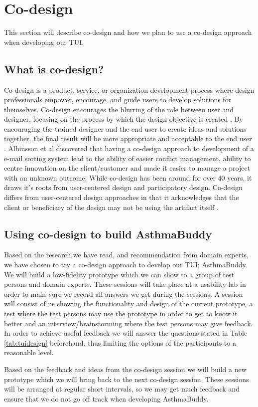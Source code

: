 \section{Co-design}
This section will describe co-design and how we plan to use a co-design approach when developing our TUI.

\subsection{What is co-design?}
Co-design is a product, service, or organization development process where design professionals empower, encourage, and guide users to develop solutions for themselves. Co-design encourages the blurring of the role between user and designer, focusing on the process by which the design objective is created \cite{sanders2008co}. By encouraging the trained designer and the end user to create ideas and solutions together, the final result will be more appropriate and acceptable to the end user \cite{albinsson2007co}. 
Albinsson et al \cite{albinsson2007co} discovered that having a co-design approach to development of a e-mail sorting system lead to the ability of easier conflict management, ability to centre innovation on the client/customer and made it easier to manage a project with an unknown outcome. While co-design has been around for over 40 years, it draws it's roots from user-centered design and participatory design. Co-design differs from user-centered design approaches in that it acknowledges that the client or beneficiary of the design may not be using the artifact itself \cite{norman1986user}.



\subsection{Using co-design to build AsthmaBuddy}
Based on the research we have read, and recommendation from domain experts, we have chosen to try a co-design approach to develop our TUI; AsthmaBuddy. We will build a low-fidelity prototype which we can show to a group of test persons and domain experts. These sessions will take place at a usability lab in order to make sure we record all answers we get during the sessions. A session will consist of us showing the functionality and design of the current prototype, a test where the test persons may use the prototype in order to get to know it better and an interview/brainstorming where the test persons may give feedback. In order to achieve useful feedback we will answer the questions stated in Table \ref{tab:tuidesign} beforehand, thus limiting the options of the participants to a reasonable level. 


Based on the feedback and ideas from the co-design session we will build a new prototype which we will bring back to the next co-design session. These sessions will be arranged at regular short intervals, so we may get much feedback and ensure that we do not go off track when developing AsthmaBuddy.